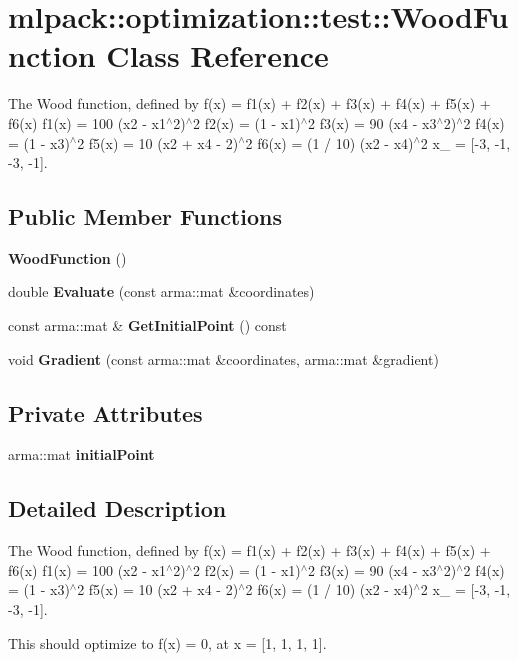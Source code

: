 \section{mlpack\-:\-:optimization\-:\-:test\-:\-:Wood\-Function Class Reference}
\label{classmlpack_1_1optimization_1_1test_1_1WoodFunction}


The Wood function, defined by f(x) = f1(x) + f2(x) + f3(x) + f4(x) + f5(x) + f6(x) f1(x) = 100 (x2 -\/ x1$^\wedge$2)$^\wedge$2 f2(x) = (1 -\/ x1)$^\wedge$2 f3(x) = 90 (x4 -\/ x3$^\wedge$2)$^\wedge$2 f4(x) = (1 -\/ x3)$^\wedge$2 f5(x) = 10 (x2 + x4 -\/ 2)$^\wedge$2 f6(x) = (1 / 10) (x2 -\/ x4)$^\wedge$2 x\-\_ = [-\/3, -\/1, -\/3, -\/1].  


\subsection*{Public Member Functions}
\begin{DoxyCompactItemize}
\item 
{\bf Wood\-Function} ()
\item 
double {\bf Evaluate} (const arma\-::mat \&coordinates)
\item 
const arma\-::mat \& {\bf Get\-Initial\-Point} () const 
\item 
void {\bf Gradient} (const arma\-::mat \&coordinates, arma\-::mat \&gradient)
\end{DoxyCompactItemize}
\subsection*{Private Attributes}
\begin{DoxyCompactItemize}
\item 
arma\-::mat {\bf initial\-Point}
\end{DoxyCompactItemize}


\subsection{Detailed Description}
The Wood function, defined by f(x) = f1(x) + f2(x) + f3(x) + f4(x) + f5(x) + f6(x) f1(x) = 100 (x2 -\/ x1$^\wedge$2)$^\wedge$2 f2(x) = (1 -\/ x1)$^\wedge$2 f3(x) = 90 (x4 -\/ x3$^\wedge$2)$^\wedge$2 f4(x) = (1 -\/ x3)$^\wedge$2 f5(x) = 10 (x2 + x4 -\/ 2)$^\wedge$2 f6(x) = (1 / 10) (x2 -\/ x4)$^\wedge$2 x\-\_ = [-\/3, -\/1, -\/3, -\/1]. 

This should optimize to f(x) = 0, at x = [1, 1, 1, 1].

